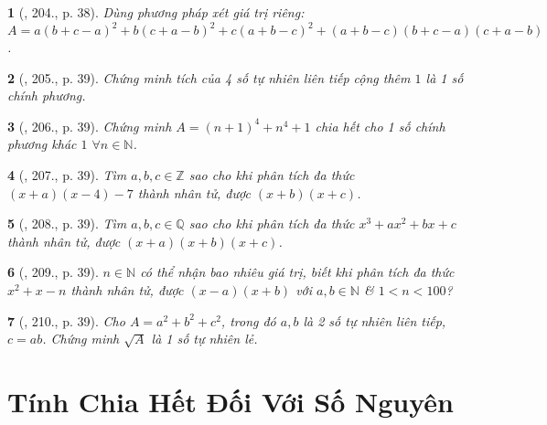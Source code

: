 \documentclass{article}
\newtheorem{baitoan}{}
\begin{document}
\begin{baitoan}[\cite{Binh_Toan_8_tap_1}, 204., p. 38]
	Dùng phương pháp xét giá trị riêng: $A = a(b + c - a)^2 + b(c + a - b)^2 + c(a + b - c)^2 + (a + b - c)(b + c - a)(c + a - b)$.
\end{baitoan}

\begin{baitoan}[\cite{Binh_Toan_8_tap_1}, 205., p. 39]
	Chứng minh tích của 4 số tự nhiên liên tiếp cộng thêm $1$ là 1 số chính phương.
\end{baitoan}

\begin{baitoan}[\cite{Binh_Toan_8_tap_1}, 206., p. 39]
	Chứng minh $A = (n + 1)^4 + n^4 + 1$ chia hết cho 1 số chính phương khác $1$ $\forall  n\in\mathbb{N}$.
\end{baitoan}

\begin{baitoan}[\cite{Binh_Toan_8_tap_1}, 207., p. 39]
	Tìm $a,b,c\in\mathbb{Z}$ sao cho khi phân tích đa thức $(x + a)(x - 4) - 7$ thành nhân tử, được $(x + b)(x + c)$.
\end{baitoan}

\begin{baitoan}[\cite{Binh_Toan_8_tap_1}, 208., p. 39]
	Tìm $a,b,c\in\mathbb{Q}$ sao cho khi phân tích đa thức $x^3 + ax^2 + bx + c$ thành nhân tử, được $(x + a)(x + b)(x + c)$.
\end{baitoan}

\begin{baitoan}[\cite{Binh_Toan_8_tap_1}, 209., p. 39]
	$n\in\mathbb{N}$ có thể nhận bao nhiêu giá trị, biết khi phân tích đa thức $x^2 + x - n$ thành nhân tử, được $(x - a)(x + b)$ với $a,b\in\mathbb{N}$ \& $1 < n < 100$?
\end{baitoan}

\begin{baitoan}[\cite{Binh_Toan_8_tap_1}, 210., p. 39]
	Cho $A = a^2 + b^2 + c^2$, trong đó $a,b$ là 2 số tự nhiên liên tiếp, $c = ab$. Chứng minh $\sqrt{A}$ là 1 số tự nhiên lẻ.
\end{baitoan}


\section{Tính Chia Hết Đối Với Số Nguyên}

\end{document}
